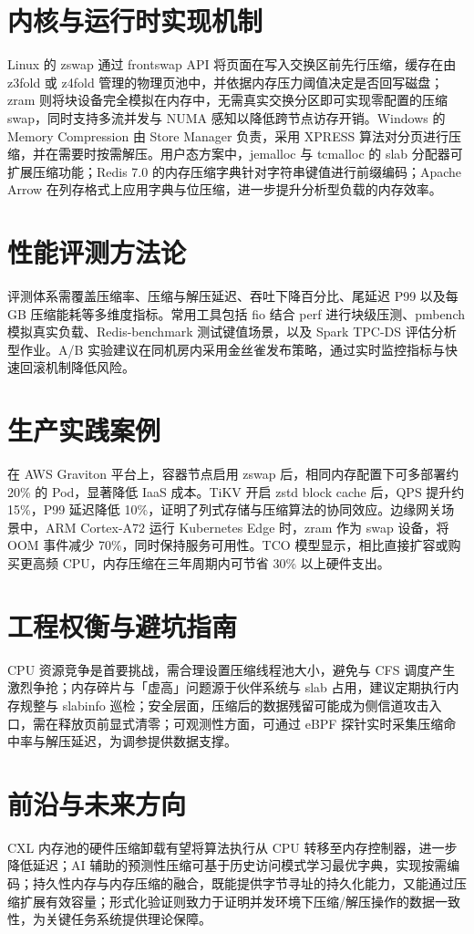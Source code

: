 \chapter{内核与运行时实现机制}
Linux 的 zswap 通过 frontswap API 将页面在写入交换区前先行压缩，缓存在由 z3fold 或 z4fold 管理的物理页池中，并依据内存压力阈值决定是否回写磁盘；zram 则将块设备完全模拟在内存中，无需真实交换分区即可实现零配置的压缩 swap，同时支持多流并发与 NUMA 感知以降低跨节点访存开销。Windows 的 Memory Compression 由 Store Manager 负责，采用 XPRESS 算法对分页进行压缩，并在需要时按需解压。用户态方案中，jemalloc 与 tcmalloc 的 slab 分配器可扩展压缩功能；Redis 7.0 的内存压缩字典针对字符串键值进行前缀编码；Apache Arrow 在列存格式上应用字典与位压缩，进一步提升分析型负载的内存效率。\par
\chapter{性能评测方法论}
评测体系需覆盖压缩率、压缩与解压延迟、吞吐下降百分比、尾延迟 P99 以及每 GB 压缩能耗等多维度指标。常用工具包括 fio 结合 perf 进行块级压测、pmbench 模拟真实负载、Redis-benchmark 测试键值场景，以及 Spark TPC-DS 评估分析型作业。A/B 实验建议在同机房内采用金丝雀发布策略，通过实时监控指标与快速回滚机制降低风险。\par
\chapter{生产实践案例}
在 AWS Graviton 平台上，容器节点启用 zswap 后，相同内存配置下可多部署约 20\%{} 的 Pod，显著降低 IaaS 成本。TiKV 开启 zstd block cache 后，QPS 提升约 15\%{}，P99 延迟降低 10\%{}，证明了列式存储与压缩算法的协同效应。边缘网关场景中，ARM Cortex-A72 运行 Kubernetes Edge 时，zram 作为 swap 设备，将 OOM 事件减少 70\%{}，同时保持服务可用性。TCO 模型显示，相比直接扩容或购买更高频 CPU，内存压缩在三年周期内可节省 30\%{} 以上硬件支出。\par
\chapter{工程权衡与避坑指南}
CPU 资源竞争是首要挑战，需合理设置压缩线程池大小，避免与 CFS 调度产生激烈争抢；内存碎片与「虚高」问题源于伙伴系统与 slab 占用，建议定期执行内存规整与 slabinfo 巡检；安全层面，压缩后的数据残留可能成为侧信道攻击入口，需在释放页前显式清零；可观测性方面，可通过 eBPF 探针实时采集压缩命中率与解压延迟，为调参提供数据支撑。\par
\chapter{前沿与未来方向}
CXL 内存池的硬件压缩卸载有望将算法执行从 CPU 转移至内存控制器，进一步降低延迟；AI 辅助的预测性压缩可基于历史访问模式学习最优字典，实现按需编码；持久性内存与内存压缩的融合，既能提供字节寻址的持久化能力，又能通过压缩扩展有效容量；形式化验证则致力于证明并发环境下压缩/解压操作的数据一致性，为关键任务系统提供理论保障。\par
